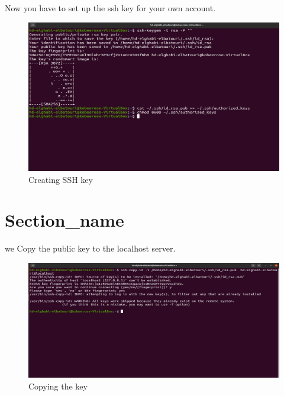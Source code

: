 \begin{spacing}{1.2}
\par Now you have to set up the ssh key for your own account.
\\
\begin{figure}[!htb] 
\begin{center} 
\includegraphics[width=1\linewidth]{Big_Data/Hadoop/Apache Hadoop Installation/Creating SSH key} 
\end{center} 
\caption{Creating SSH key} 
\end{figure} 
\FloatBarrier

\section{Section_name}

\par we Copy the public key to the localhost server.
\\
\begin{figure}[!htb] 
\begin{center} 
\includegraphics[width=1\linewidth]{Big_Data/Hadoop/Apache Hadoop Installation/Copying the key} 
\end{center} 
\caption{Copying the key} 
\end{figure} 
\FloatBarrier




\end{spacing}
